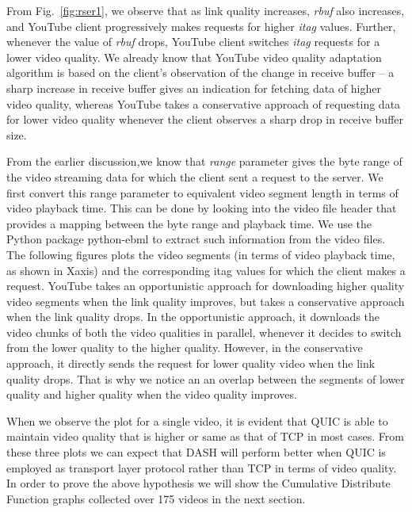 From Fig.~\ref{fig:rser1}, we observe that as link quality increases, \textit{rbuf} also increases, and YouTube client progressively makes requests for higher \textit{itag} values. Further, whenever the value of \textit{rbuf} drops, YouTube client switches \textit{itag} requests for a lower video quality. We already know that YouTube video quality adaptation algorithm is based on the client’s observation of the change in receive buffer – a sharp increase in receive buffer gives an indication for fetching data of higher video quality, whereas YouTube takes a conservative approach of requesting data for lower video quality whenever the client observes a sharp drop in receive buffer size.

From the earlier discussion,we know that \textit{range} parameter gives the byte range of the video streaming data for which the client sent a request to the server. We first convert this range parameter to equivalent video segment length in terms of video playback time. This can be done by looking into the video file header that provides a mapping between the byte range and playback time. We use the Python package {\selectfont python-ebml} to extract such information from the video files. The following figures plots the video segments (in terms of video playback time, as shown in Xaxis) and the corresponding itag values for which the client makes a request. YouTube takes an opportunistic approach for downloading higher quality video segments when the link quality improves, but takes a conservative approach when the link quality drops. In the opportunistic approach, it downloads the video chunks of both the video qualities in parallel, whenever it decides to switch from the lower quality to the higher quality. However, in the conservative approach, it directly sends the request for lower quality video when the link quality drops. That is why we notice an an overlap between the segments of lower quality and higher quality when the video quality improves.

When we observe the plot for a single video, it is evident that QUIC is able to maintain video quality that is higher or same as that of TCP in most cases. From these three plots we can expect that DASH will perform better when QUIC is employed as transport layer protocol rather than TCP in terms of video quality. In order to prove the above hypothesis we will show the Cumulative Distribute Function graphs collected over 175 videos in the next section.

